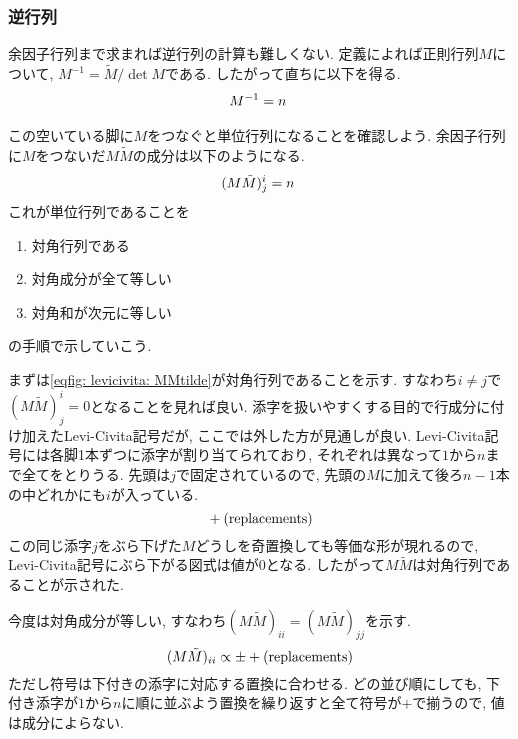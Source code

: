 \documentclass[dvipdfmx]{jsarticle}
\begin{document}
\subsubsection{逆行列}

余因子行列まで求まれば逆行列の計算も難しくない.
定義によれば正則行列$M$について, $M^{-1}=\tilde{M}/\det M$である.
したがって直ちに以下を得る.
\begin{equation}
    \label{eqfig: levicivita: inverse}
    M^{-1}
    =
    n
    \frac{\vcenter{\hbox{}}}{\vcenter{\hbox{}}}
\end{equation}

この空いている脚に$M$をつなぐと単位行列になることを確認しよう.
余因子行列に$M$をつないだ$M\tilde{M}$の成分は以下のようになる.
\begin{equation}
    \label{eqfig: levicivita: MMtilde}
    (M\tilde{M})^i_j
    =
    n
    \frac{\vcenter{\hbox{}}}{\vcenter{\hbox{}}}
\end{equation}
これが単位行列であることを
\begin{enumerate}
    \item 対角行列である
    \item 対角成分が全て等しい
    \item 対角和が次元に等しい
\end{enumerate}
の手順で示していこう.

まずは\eqref{eqfig: levicivita: MMtilde}が対角行列であることを示す.
すなわち$i\neq j$で$(M\tilde{M})^i_j=0$となることを見れば良い.
添字を扱いやすくする目的で行成分に付け加えたLevi-Civita記号だが, ここでは外した方が見通しが良い.
Levi-Civita記号には各脚1本ずつに添字が割り当てられており, それぞれは異なって$1$から$n$まで全てをとりうる.
先頭は$j$で固定されているので, 先頭の$M$に加えて後ろ$n-1$本の中どれかにも$i$が入っている.
\begin{equation*}
    \vcenter{\hbox{}}
    \vcenter{\hbox{}}
    +(\mathrm{replacements})
\end{equation*}
この同じ添字$j$をぶら下げた$M$どうしを奇置換しても等価な形が現れるので, Levi-Civita記号にぶら下がる図式は値が$0$となる.
したがって$M\tilde{M}$は対角行列であることが示された.

今度は対角成分が等しい, すなわち$(M\tilde{M})_{ii}=(M\tilde{M})_{jj}$を示す.
\begin{equation*}
    (M\tilde{M})_{ii}
    \propto
    \pm
    \vcenter{\hbox{}}
    +(\mathrm{replacements})
\end{equation*}
ただし符号は下付きの添字に対応する置換に合わせる.
どの並び順にしても, 下付き添字が$1$から$n$に順に並ぶよう置換を繰り返すと全て符号が$+$で揃うので, 値は成分によらない.
\end{document}
